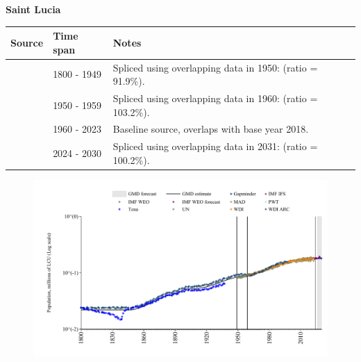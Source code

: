 \documentclass[12pt,a4paper,landscape]{article}
\begin{document}
\begin{adjustbox}{max totalsize={\paperwidth}{\paperheight},center}
\begin{minipage}[t][\textheight][t]{\textwidth}
\vspace*{0.5cm}
{}
\begin{center}
{\Large\bfseries Saint Lucia}
\end{center}
\vspace{0.5cm}
\begin{table}[H]
\centering
\small
\begin{tabular}{|l|l|l|}
\hline
\textbf{Source} & \textbf{Time span} & \textbf{Notes} \\
\hline
\rowcolor{white}\cite{Gapminder}& 1800 - 1949 &Spliced using overlapping data in 1950: (ratio = 91.9\%).\\
\rowcolor{lightgray}\cite{IMF_IFS}& 1950 - 1959 &Spliced using overlapping data in 1960: (ratio = 103.2\%).\\
\rowcolor{white}\cite{WDI}& 1960 - 2023 &Baseline source, overlaps with base year 2018.\\
\rowcolor{lightgray}\cite{Gapminder}& 2024 - 2030 &Spliced using overlapping data in 2031: (ratio = 100.2\%).\\
\hline
\end{tabular}
\end{table}
\begin{figure}[H]
\centering
\includegraphics[width=\textwidth,height=0.6\textheight,keepaspectratio]{graphs/LCA_pop.pdf}
\end{figure}
\end{minipage}
\end{adjustbox}
\end{document}
